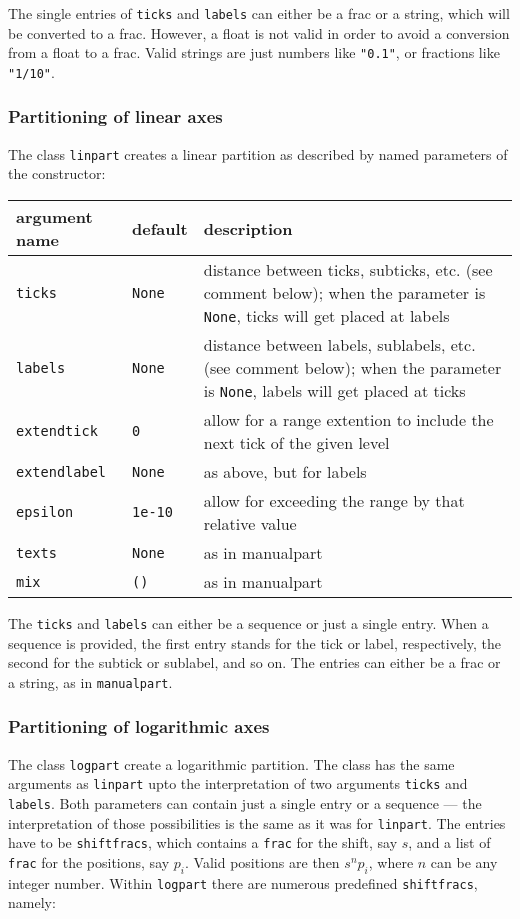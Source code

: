 The single entries of \verb|ticks| and \verb|labels| can either be a
frac or a string, which will be converted to a frac. However, a float
is not valid in order to avoid a conversion from a float to a frac.
Valid strings are just numbers like \verb|"0.1"|, or fractions like
\verb|"1/10"|.

\subsubsection{Partitioning of linear axes}

The class \verb|linpart| creates a linear partition as described by
named parameters of the constructor:

\medskip
\begin{tabularx}{\linewidth}{ll>{\raggedright\arraybackslash}X}
argument name&default&description\\
\hline
\texttt{ticks}&\texttt{None}&distance between ticks, subticks, etc. (see comment below); when the parameter is \texttt{None}, ticks will get placed at labels\\
\texttt{labels}&\texttt{None}&distance between labels, sublabels, etc. (see comment below); when the parameter is \texttt{None}, labels will get placed at ticks\\
\texttt{extendtick}&\texttt{0}&allow for a range extention to include the next tick of the given level\\
\texttt{extendlabel}&\texttt{None}&as above, but for labels\\
\texttt{epsilon}&\texttt{1e-10}&allow for exceeding the range by that relative value\\
\texttt{texts}&\texttt{None}&as in manualpart\\
\texttt{mix}&\texttt{()}&as in manualpart\\
\end{tabularx}
\medskip

The \verb|ticks| and \verb|labels| can either be a sequence or just a
single entry. When a sequence is provided, the first entry stands for
the tick or label, respectively, the second for the subtick or
sublabel, and so on. The entries can either be a frac or a string,
as in \verb|manualpart|.

\subsubsection{Partitioning of logarithmic axes}

The class \verb|logpart| create a logarithmic partition. The class has
the same arguments as \verb|linpart| upto the interpretation of two
arguments \verb|ticks| and \verb|labels|. Both parameters can contain
just a single entry or a sequence --- the interpretation of those
possibilities is the same as it was for \verb|linpart|. The entries
have to be \verb|shiftfracs|, which contains a \verb|frac| for the
shift, say $s$, and a list of \verb|frac| for the positions, say
$p_i$. Valid positions are then $s^np_i$, where $n$ can be any integer
number. Within \verb|logpart| there are numerous predefined
\verb|shiftfracs|, namely:

